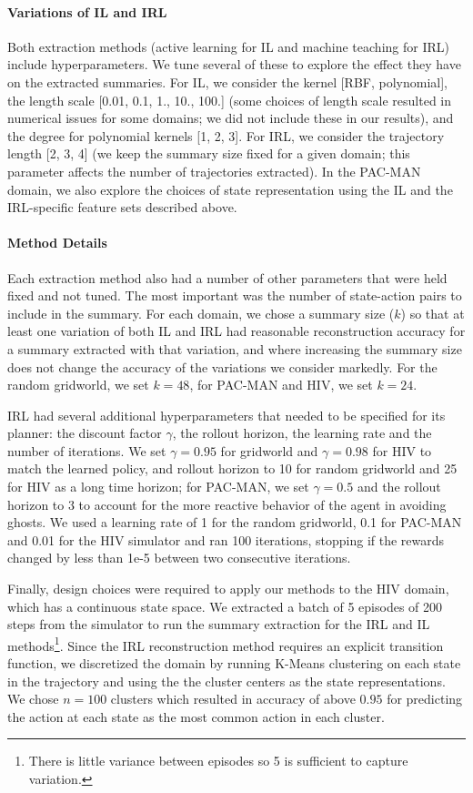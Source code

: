\documentclass{article}
\begin{document}
\paragraph{Variations of IL and IRL} Both extraction methods (active learning for IL and machine teaching for IRL) include hyperparameters. We tune several of these to explore the effect they have on the extracted summaries. For IL, we consider the kernel [RBF, polynomial], the length scale [0.01, 0.1, 1., 10., 100.] (some choices of length scale resulted in numerical issues for some domains; we did not include these in our results), and the degree for polynomial kernels [1, 2, 3]. For IRL, we consider the trajectory length [2, 3, 4] (we keep the summary size fixed for a given domain; this parameter affects the number of trajectories extracted). In the PAC-MAN domain, we also explore the choices of state representation using the IL and the IRL-specific feature sets described above.

\paragraph{Method Details} Each extraction method also had a number of other parameters that were held fixed and not tuned. The most important was the number of state-action pairs to include in the summary. For each domain, we chose a summary size ($k$) so that at least one variation of both IL and IRL had reasonable reconstruction accuracy for a summary extracted with that variation, and where increasing the summary size does not change the accuracy of the variations we consider markedly. For the random gridworld, we set $k = 48$, for PAC-MAN and HIV, we set $k=24$. 

IRL had several additional hyperparameters that needed to be specified for its planner: the discount factor $\gamma$, the rollout horizon, the learning rate and the number of iterations. We set $\gamma = 0.95$ for gridworld and $\gamma = 0.98$ for HIV to match the learned policy, and rollout horizon to 10 for random gridworld and 25 for HIV as a long time horizon; for PAC-MAN, we set $\gamma = 0.5$ and the rollout horizon to 3 to account for the more reactive behavior of the agent in avoiding ghosts. We used a learning rate of 1 for the random gridworld, 0.1 for PAC-MAN and 0.01 for the HIV simulator and ran 100 iterations, stopping if the rewards changed by less than 1e-5 between two consecutive iterations.

Finally, design choices were required to apply our methods to the HIV domain, which has a continuous state space. We extracted a batch of 5 episodes of 200 steps from the simulator to run the summary extraction for the IRL and IL methods\footnote{There is little variance between episodes so 5 is sufficient to capture variation.}. Since the IRL reconstruction method requires an explicit transition function, we discretized the domain by running K-Means clustering on each state in the trajectory and using the the cluster centers as the state representations. We chose $n=100$ clusters which resulted in accuracy of above $0.95$ for predicting the action at each state as the most common action in each cluster. 
\end{document}
